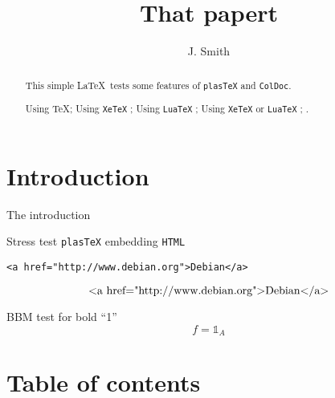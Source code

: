 \documentclass{article}
\newif\ifplastex\plastexfalse
\newcommand\mathbbm[1]{{\mathbb{#1}}}
\newcommand\mathbbm[1]{{\mathbb{#1}}}
\begin{document}
\author{J. Smith}
\title{That papert}
\maketitle
\section*{Introduction}
The introduction

\begin{abstract}
  This simple \LaTeX\ tests some features
  of \texttt{plasTeX} and \texttt{ColDoc}.

  \ifetex Using  \TeX \fi ;
  \ifxetex Using \texttt{XeTeX} \fi ;
  \ifluatex Using \texttt{LuaTeX} \fi ;
  \iftutex Using \texttt{XeTeX} or \texttt{LuaTeX} \fi ;
  \ifplastex Using \texttt{plasTeX} \fi .

\end{abstract}

Stress test  \texttt{plasTeX} embedding \texttt{HTML}
\begin{verbatim}
<a href="http://www.debian.org">Debian</a>
\end{verbatim}
\[ \hbox{<a href="http://www.debian.org">Debian</a>} \]

BBM test for bold ``1''
\[f={\mathbbm{1}}_A\]





\section*{Table of contents}
\tableofcontents
\end{document}
